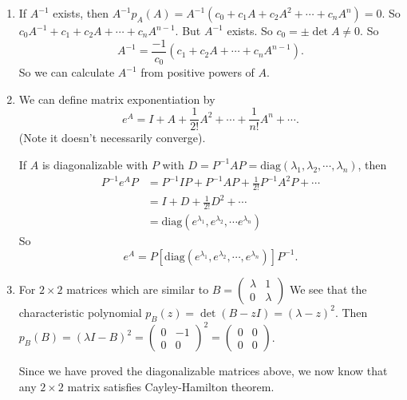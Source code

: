 \documentclass[a4paper]{article}
\begin{document}
      \note
      \begin{enumerate}
        \item If $A^{-1}$ exists, then $A^{-1} p_A(A) = A^{-1}(c_0 + c_1A + c_2A^2 + \cdots + c_n A^n) = 0$. So $c_0 A^{-1} + c_1 + c_2A + \cdots + c_n A^{n - 1}$. But $A^{-1}$ exists. So $c_0 = \pm \det A \not= 0$. So
          \[
            A^{-1} = \frac{-1}{c_0}(c_1 + c_2 A + \cdots + c_n A^{n -1}).
          \]
          So we can calculate $A^{-1}$ from positive powers of $A$.
        \item We can define matrix exponentiation by
          \[
            e^A = I + A + \frac{1}{2!}A^2 + \cdots + \frac{1}{n!}A^n + \cdots.
          \]
          (Note it doesn't necessarily converge).

          If $A$ is diagonalizable with $P$ with $D = P^{-1}AP = \mathrm{diag}(\lambda_1, \lambda_2, \cdots, \lambda_n)$, then
          \begin{align*}
            P^{-1}e^A P &= P^{-1}IP + P^{-1}AP + \frac{1}{2!}P^{-1}A^2P + \cdots\\
            &= I + D + \frac{1}{2!}D^{2} + \cdots\\
            &= \mathrm{diag}(e^{\lambda_1}, e^{\lambda_2}, \cdots e^{\lambda_n})
          \end{align*}
          So
          \[
            e^A = P[\mathrm{diag}(e^{\lambda_1}, e^{\lambda_2}, \cdots, e^{\lambda_n})]P^{-1}.
          \]
        \item For $2\times 2$ matrices which are similar to $B = 
          \begin{pmatrix}
            \lambda & 1\\
            0 & \lambda
          \end{pmatrix}$
          We see that the characteristic polynomial $p_B(z) = \det (B - zI) = (\lambda - z)^2$. Then $p_B(B) = (\lambda I - B)^2 = 
          \begin{pmatrix}
            0 & -1\\
            0 & 0
          \end{pmatrix}^2 = 
          \begin{pmatrix}
            0 & 0\\
            0 & 0
          \end{pmatrix}$.

          Since we have proved the diagonalizable matrices above, we now know that any $2\times 2$ matrix satisfies Cayley-Hamilton theorem. 
      \end{enumerate}
\end{document}
